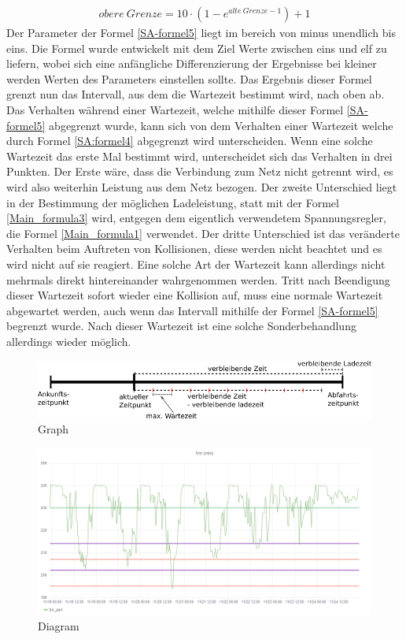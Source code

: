 \begin{align}
	obere\ Grenze = 10 \cdot (1 - e^{alte\ Grenze - 1}) + 1
	\label{SA-formel5}
\end{align}
Der Parameter der Formel \ref{SA-formel5} liegt im bereich von minus unendlich bis eins. Die Formel wurde entwickelt mit dem Ziel Werte zwischen eins und elf zu liefern, wobei sich eine anfängliche Differenzierung der Ergebnisse bei kleiner werden Werten des Parameters einstellen sollte. Das Ergebnis dieser Formel grenzt nun das Intervall, aus dem die Wartezeit bestimmt wird, nach oben ab. Das Verhalten während einer Wartezeit, welche mithilfe dieser Formel \ref{SA-formel5} abgegrenzt wurde, kann sich von dem Verhalten einer Wartezeit welche durch Formel \ref{SA:formel4} abgegrenzt wird unterscheiden. Wenn eine solche Wartezeit das erste Mal bestimmt wird, unterscheidet sich das Verhalten in drei Punkten. Der Erste wäre, dass die Verbindung zum Netz nicht getrennt wird, es wird also weiterhin Leistung aus dem Netz bezogen. Der zweite Unterschied liegt in der Bestimmung der möglichen Ladeleistung, statt mit der Formel \ref{Main_formula3} wird, entgegen dem eigentlich verwendetem Spannungsregler, die Formel \ref{Main_formula1} verwendet. Der dritte Unterschied ist das veränderte Verhalten beim Auftreten von Kollisionen, diese werden nicht beachtet und es wird nicht auf sie reagiert. Eine solche Art der Wartezeit kann allerdings nicht mehrmals direkt hintereinander wahrgenommen werden. Tritt nach Beendigung dieser Wartezeit sofort wieder eine Kollision auf, muss eine normale Wartezeit abgewartet werden, auch wenn das Intervall mithilfe der Formel \ref{SA-formel5} begrenzt wurde. Nach dieser Wartezeit ist eine solche Sonderbehandlung allerdings wieder möglich.
\begin{figure}[htb]
	\includegraphics[width = \linewidth]{img/SA_waiting_Graph3.png}
	\caption{Graph}
	\label{SAWait:Graph}
\end{figure}
\begin{figure}[htb]
	\includegraphics[width=\linewidth]{img/dia1.png}
	\caption{Diagram}
	\label{dia1}
\end{figure}

